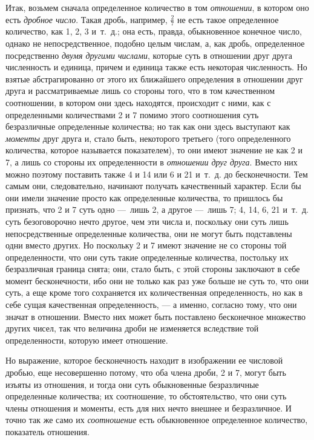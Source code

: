Итак, возьмем сначала определенное количество в том
{\em отношении}, в котором оно есть
{\em дробное число}. Такая дробь, например,  $\frac 2
7$  не есть такое определенное количество, как 1, 2, 3 и~т.~д.; она есть,
правда, обыкновенное конечное число, однако не непосредственное, подобно
целым числам, а, как дробь, определенное посредственно
{\em двумя другими числами}, которые суть в отношении
друг друга численность и единица, причем и единица также есть некоторая
численность. Но взятые абстрагированно от этого их ближайшего определения в
отношении друг друга и рассматриваемые лишь со стороны того, что в том
качественном соотношении, в котором они здесь находятся, происходит с ними,
как с определенными количествами 2 и 7 помимо этого соотношения суть
безразличные определенные количества; но так как они здесь выступают как
{\em моменты} друг друга и, стало быть, некоторого
третьего (того определенного количества, которое называется показателем),
то они имеют значение не как 2 и 7, а лишь со стороны их определенности в
{\em отношении друг друга}. Вместо них можно поэтому
поставить также 4 и 14 или 6 и 21 и~т.~д. до бесконечности. Тем самым они,
следовательно, начинают получать качественный характер. Если бы они имели
значение просто как определенные количества, то пришлось бы признать, что 2
и 7 суть одно —~лишь 2, а другое —~лишь 7; 4, 14, 6, 21 и~т.~д. суть
безоговорочно нечто другое, чем эти числа и, поскольку они суть лишь
непосредственные определенные количества, они не могут быть подставлены
одни вместо других. Но поскольку 2 и 7 имеют значение не со стороны той
определенности, что они суть такие определенные количества, постольку их
безразличная граница снята; они, стало быть, с этой стороны заключают в
себе момент бесконечности, ибо они не только как раз уже больше не суть то,
что они суть, а еще кроме того сохраняется их количественная
определенность, но как в себе сущая качественная определенность, — а
именно, согласно тому, что они значат в отношении. Вместо них может быть
поставлено бесконечное множество других чисел, так что величина дроби не
изменяется вследствие той определенности, которую имеет отношение.

Но выражение, которое бесконечность находит в изображении ее числовой
дробью, еще несовершенно потому, что оба члена дроби, 2 и 7, могут быть
изъяты из отношения, и тогда они суть обыкновенные безразличные
определенные количества; их соотношение, то обстоятельство, что они суть
члены отношения и моменты, есть для них нечто внешнее и безразличное. И
точно так же само их {\em соотношение} есть
обыкновенное определенное количество, показатель отношения.

